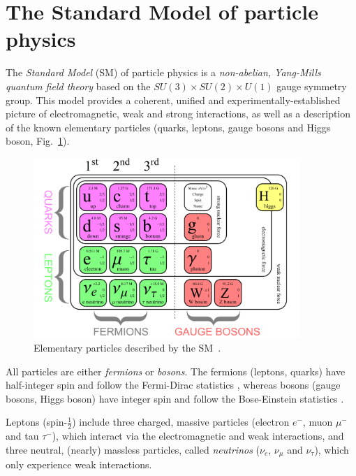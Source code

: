 \section{The Standard Model of particle physics}
\label{sec:sm}

The \emph{Standard Model} (SM) of particle physics \cite{Salam, Weinberg, Glashow} is a \emph{non-abelian, Yang-Mills quantum field theory} based on the $SU(3)\times SU(2)\times U(1)$ 
gauge symmetry group. This model provides a coherent, unified and experimentally-established picture of electromagnetic, weak and strong interactions, as well as
a description of the known elementary particles (quarks, leptons, gauge bosons and Higgs boson, Fig.~\ref{fig:particles}).

\begin{figure}[htbp]
  \begin{center}
    \includegraphics[width=0.9\textwidth]{01StandardModel/figs/particles.png}
  \end{center}
  \vspace{-2mm}
  \caption{Elementary particles described by the SM~\cite{sm-cartoon}.}
  \label{fig:particles}
\end{figure}


All particles are either \emph{fermions} or \emph{bosons}. The fermions (leptons, quarks) have half-integer spin and follow the Fermi-Dirac statistics \cite{Fermi, Dirac}, whereas bosons (gauge bosons, Higgs boson) 
have integer spin and follow the Bose-Einstein statistics \cite{Bose}.

Leptons (spin-$\frac{1}{2}$) include three charged, massive particles (electron $e^-$, muon $\mu^-$ and tau $\tau^-$), which interact via the electromagnetic and weak interactions, and three neutral, (nearly) massless particles, called \emph{neutrinos} ($\nu_{e}$, $\nu_{\mu}$ and $\nu_{\tau}$), which only experience weak interactions.

